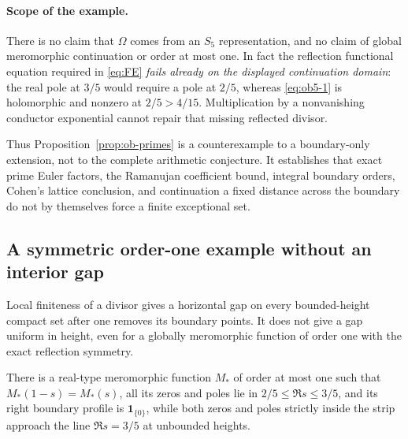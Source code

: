 \paragraph{Scope of the example.}

There is no claim that \(\Omega\) comes from an \(S_5\) representation, and no claim of global meromorphic continuation or order at most one. In fact the reflection functional equation required in \eqref{eq:FE} \emph{fails already on the displayed continuation domain}: the real pole at \(3/5\) would require a pole at \(2/5\), whereas \eqref{eq:ob5-1} is holomorphic and nonzero at \(2/5>4/15\). Multiplication by a nonvanishing conductor exponential cannot repair that missing reflected divisor.

Thus Proposition~\ref{prop:ob-primes} is a counterexample to a boundary-only extension, not to the complete arithmetic conjecture. It establishes that exact prime Euler factors, the Ramanujan coefficient bound, integral boundary orders, Cohen's lattice conclusion, and continuation a fixed distance across the boundary do not by themselves force a finite exceptional set.

\subsection{A symmetric order-one example without an interior gap}

Local finiteness of a divisor gives a horizontal gap on every bounded-height compact set after one removes its boundary points. It does not give a gap uniform in height, even for a globally meromorphic function of order one with the exact reflection symmetry.

\begin{proposition}\label{prop:ob-gap}

There is a real-type meromorphic function \(M_*\) of order at most one such that \(M_*(1-s)=M_*(s)\), all its zeros and poles lie in \(2/5\le\Re s\le3/5\), and its right boundary profile is \(\mathbf1_{\{0\}}\), while both zeros and poles strictly inside the strip approach the line \(\Re s=3/5\) at unbounded heights.

\end{proposition}

